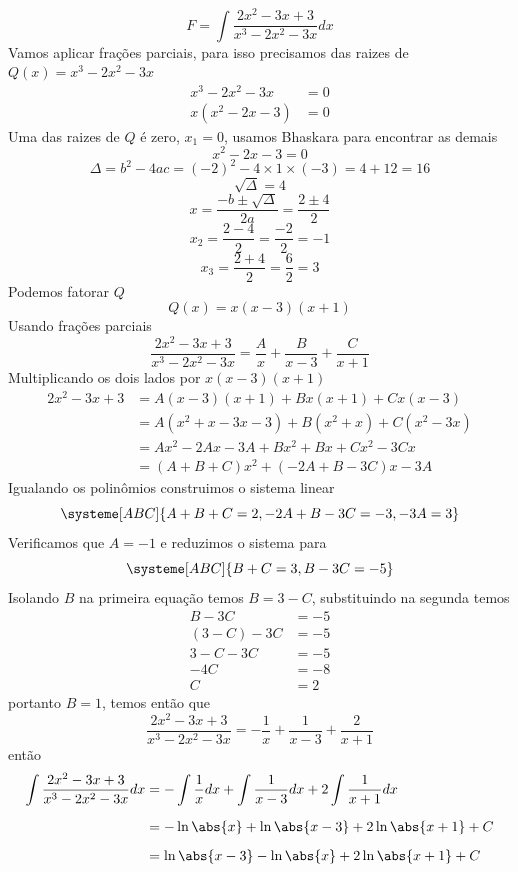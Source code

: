 \documentclass[a4paper,12pt,fleqn]{article}
\begin{document}
\begin{answer}
  \[
    F = \int \frac{2x^2 -3 x + 3}{x^3-2x^2-3x} dx
  \]
  Vamos aplicar frações parciais, para isso precisamos das raizes de \(Q(x)=x^3-2x^2-3x\)
  \begin{align*}
    x^3-2x^2-3x & = 0 \\
    x(x^2-2x-3) & = 0
  \end{align*}
  Uma das raizes de $Q$ é zero, $x_1=0$, usamos Bhaskara para encontrar as demais
  \[
    x^2-2x-3 = 0
  \]
  \[
    \Delta
    = b^2 - 4ac
    = (-2)^2 - 4\times 1 \times (-3)
    = 4 + 12
    = 16
  \]
  \[
    \sqrt{\Delta} = 4
  \]
  \[
    x
    = \frac{-b\pm\sqrt{\Delta}}{2a}
    = \frac{2\pm 4}{2}
  \]
  \[
    x_2
    = \frac{2-4}{2}
    = \frac{-2}{2}
    = -1
  \]
  \[
    x_3
    = \frac{2+4}{2}
    = \frac{6}{2}
    = 3
  \]
  Podemos fatorar $Q$
  \[
    Q(x) = x(x-3)(x+1)
  \]
  Usando frações parciais
  \[
    \frac{2x^2 -3 x + 3}{x^3-2x^2-3x} = \frac{A}{x} + \frac{B}{x-3} + \frac{C}{x+1}
  \]
  Multiplicando os dois lados por \(x(x-3)(x+1)\)
  \begin{align*}
    2x^2 -3x + 3
     & = A(x-3)(x+1) + Bx(x+1) + C x(x-3) \\
     & = A(x^2 +x -3x -3) + B(x^2+x) + C(x^2-3x) \\
     & = Ax^2 - 2Ax -3A + Bx^2 +Bx +Cx^2 - 3Cx \\
     & = (A+B+C)x^2 + (-2A+B-3C)x -3A
  \end{align*}
  Igualando os polinômios construimos o sistema linear
  \[
    \systeme[ABC]{
        A +B + C = 2,
      -2A +B -3C =-3,
      -3A        = 3
    }
  \]
  Verificamos que \(A=-1\) e reduzimos o sistema para
  \[
    \systeme[ABC]{
      B +  C =  3,
      B - 3C = -5
    }
  \]
  Isolando $B$ na primeira equação temos $B=3-C$, substituindo na segunda temos
  \begin{align*}
    B - 3C     & = -5 \\
    (3-C) - 3C & = -5 \\
    3 - C - 3C & = -5 \\
    -4C        & = -8 \\
    C          & = 2
  \end{align*}
  portanto $B=1$, temos então que
  \[
    \frac{2x^2 -3 x + 3}{x^3-2x^2-3x} = -\frac{1}{x} + \frac{1}{x-3} + \frac{2}{x+1}
  \]
  então
  \begin{align*}
    \int \frac{2x^2 -3 x + 3}{x^3-2x^2-3x} dx
    & = -\int \frac{1}{x} dx + \int \frac{1}{x-3} dx + 2\int \frac{1}{x+1} dx \\[2mm]
    & = -\ln\abs{x} + \ln\abs{x-3} + 2\ln\abs{x+1} + C \\[2mm]
    & = \ln\abs{x-3} - \ln\abs{x} + 2\ln\abs{x+1} + C
  \end{align*}
  \clearpage
\end{answer}
\end{document}
